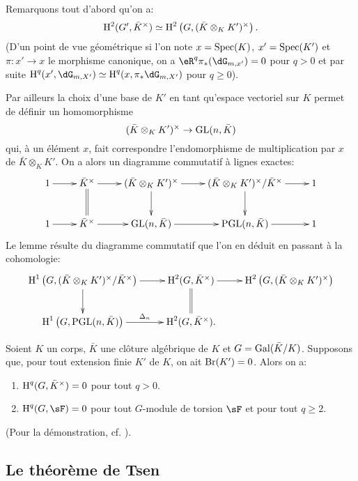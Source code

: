 Remarquons tout d'abord qu'on a: 
\[
  \operatorname{H}^2(G',\bar K^\times) \simeq \operatorname{H}^2\left(G,(\bar K\otimes_K K')^\times\right)\text{.}
\]
(D'un point de vue géométrique si l'on note $x=\operatorname{Spec}(K)$, $x'=\operatorname{Spec}(K')$ et 
$\pi:x'\to x$ le morphisme canonique, on a $\eR^q \pi_*(\dG_{m,x'}) = 0$ pour 
$q>0$ et par suite $\h^q(x',\dG_{m,X'})\simeq \h^q(x,\pi_*\dG_{m,X'})$ pour 
$q\geqslant 0$). 

Par ailleurs la choix d'une base de $K'$ en tant qu'espace vectoriel sur $K$ 
permet de définir un homomorphisme 
\[
  (\bar K\otimes_K K')^\times \to \operatorname{GL}(n,\bar K)
\]
qui, à un élément $x$, fait correspondre l'endomorphisme de 
multiplication par $x$ de $\bar K\otimes_K K'$. On a alors un diagramme 
commutatif à lignes exactes: 
\[\xymatrix{
  1 \ar[r] 
    & \bar K^\times \ar[r] \ar@{=}[d]
    & (\bar K\otimes_K K')^\times \ar[r] \ar[d] 
    & (\bar K\otimes_K K')^\times / \bar K^\times \ar[r] \ar[d] 
    & 1 \\
  1 \ar[r] 
    & \bar K^\times \ar[r] 
    & \gl(n,\bar K) \ar[r] 
    & \pgl(n,\bar K) \ar[r] 
    & 1
}\]
Le lemme résulte du diagramme commutatif que l'on en déduit en passant 
à la cohomologie:
\[\xymatrix{
  \h^1\left(G,(\bar K\otimes_K K')^\times/\bar K^\times\right) \ar[r] \ar[d] 
    & \h^2(G,\bar K^\times) \ar[r] \ar@{=}[d]
    & \h^2\left(G,(\bar K\otimes_K K')^\times\right) \\
  \h^1\left(G,\pgl(n,\bar K)\right) \ar[r]^-{\Delta_n} 
    & \h^2(G,\bar K^\times) \text{.}
}\]





\begin{proposition}\label{I:3-1-6}
Soient $K$ un corps, $\bar K$ une clôture algébrique de $K$ et 
$G=\operatorname{Gal}(\bar K/K)$. Supposons que, pour tout extension finie $K'$ de $K$, on 
ait $\operatorname{Br}(K')=0$. Alors on a:
\begin{enumerate}[\indent i)]
  \item $\operatorname{H}^q(G,\bar K^\times) = 0$ pour tout $q>0$.
  \item $\h^q(G,\sF) = 0$ pour tout $G$-module de torsion $\sF$ et pour tout 
    $q\geqslant 2$.
\end{enumerate}
\end{proposition}

(Pour la démonstration, cf. \cite{se94}).










\subsection{Le théorème de Tsen}\label{I:3-2}





